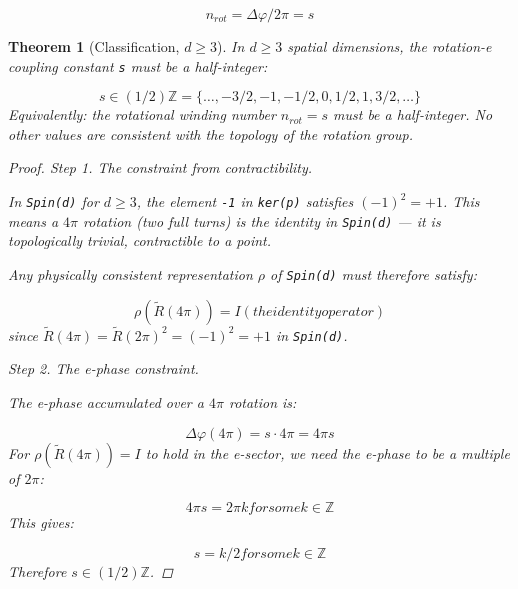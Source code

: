 \documentclass[aps,prd,preprint,superscriptaddress,longbibliography,floatfix]{revtex4-2}
\newtheorem{theorem}{Theorem}[section]
\theoremstyle{remark}
\begin{document}
\begin{equation}
    n_{rot} = \Delta\varphi / 2\pi = s
\end{equation}
\begin{theorem}[Classification, $d \geq 3$]
\label{thm:B11} \textit{In $d \geq 3$ spatial dimensions, the rotation-e coupling constant \texttt{s} must be a half-integer:}


\begin{equation}
    s \in (1/2)\mathbb{Z} = \{\ldots, -3/2, -1, -1/2, 0, 1/2, 1, 3/2, \ldots\}
\end{equation}
\textit{Equivalently: the rotational winding number $n_{rot} = s$ must be a half-integer. No other values are consistent with the topology of the rotation group.}

\begin{proof}

\textit{Step 1. The constraint from contractibility.}

In \texttt{Spin(d)} for $d \geq 3$, the element \texttt{-1} in \texttt{ker(p)} satisfies $(-1)^{2} = +1$. This means a $4\pi$ rotation (two full turns) is the identity in \texttt{Spin(d)} --- it is topologically trivial, contractible to a point.

Any physically consistent representation $\rho$ of \texttt{Spin(d)} must therefore satisfy:


\begin{equation}
    \rho(\tilde{R}(4\pi)) = I    (the identity operator)
\end{equation}
since $\tilde{R}(4\pi) = \tilde{R}(2\pi)^{2} = (-1)^{2} = +1$ in \texttt{Spin(d)}.

\textit{Step 2. The e-phase constraint.}

The e-phase accumulated over a $4\pi$ rotation is:


\begin{equation}
    \Delta\varphi(4\pi) = s \cdot 4\pi = 4\pi s
\end{equation}
For $\rho(\tilde{R}(4\pi)) = I$ to hold in the e-sector, we need the e-phase to be a multiple of $2\pi$:


\begin{equation}
    4\pi s = 2\pi k    for some k \in \mathbb{Z}
\end{equation}
This gives:


\begin{equation}
    s = k/2    for some k \in \mathbb{Z}
\end{equation}
Therefore $s \in (1/2)\mathbb{Z}$. \end{proof}
\end{theorem}
\end{document}
